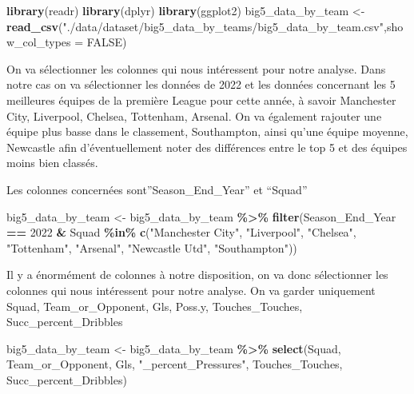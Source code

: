 \documentclass[
]{article}
\newenvironment{Shaded}{\begin{snugshade}}{\end{snugshade}}
\newcommand{\AttributeTok}[1]{\textcolor[rgb]{0.13,0.29,0.53}{#1}}
\newcommand{\ConstantTok}[1]{\textcolor[rgb]{0.56,0.35,0.01}{#1}}
\newcommand{\DecValTok}[1]{\textcolor[rgb]{0.00,0.00,0.81}{#1}}
\newcommand{\FunctionTok}[1]{\textcolor[rgb]{0.13,0.29,0.53}{\textbf{#1}}}
\newcommand{\NormalTok}[1]{#1}
\newcommand{\OtherTok}[1]{\textcolor[rgb]{0.56,0.35,0.01}{#1}}
\newcommand{\SpecialCharTok}[1]{\textcolor[rgb]{0.81,0.36,0.00}{\textbf{#1}}}
\newcommand{\StringTok}[1]{\textcolor[rgb]{0.31,0.60,0.02}{#1}}
\begin{document}
\begin{Shaded}
\begin{Highlighting}[]
\FunctionTok{library}\NormalTok{(readr)}
\FunctionTok{library}\NormalTok{(dplyr)}
\FunctionTok{library}\NormalTok{(ggplot2)}
\NormalTok{big5\_data\_by\_team }\OtherTok{\textless{}{-}} \FunctionTok{read\_csv}\NormalTok{(}\StringTok{"./data/dataset/big5\_data\_by\_teams/big5\_data\_by\_team.csv"}\NormalTok{,}\AttributeTok{show\_col\_types =} \ConstantTok{FALSE}\NormalTok{)}
\end{Highlighting}
\end{Shaded}

On va sélectionner les colonnes qui nous intéressent pour notre analyse.
Dans notre cas on va sélectionner les données de 2022 et les données
concernant les 5 meilleures équipes de la première League pour cette
année, à savoir Manchester City, Liverpool, Chelsea, Tottenham, Arsenal.
On va également rajouter une équipe plus basse dans le classement,
Southampton, ainsi qu'une équipe moyenne, Newcastle afin
d'éventuellement noter des différences entre le top 5 et des équipes
moins bien classés.

Les colonnes concernées sont''Season\_End\_Year'' et ``Squad''

\begin{Shaded}
\begin{Highlighting}[]
\NormalTok{big5\_data\_by\_team }\OtherTok{\textless{}{-}}\NormalTok{ big5\_data\_by\_team }\SpecialCharTok{\%\textgreater{}\%} \FunctionTok{filter}\NormalTok{(Season\_End\_Year }\SpecialCharTok{==} \DecValTok{2022} \SpecialCharTok{\&}\NormalTok{ Squad }\SpecialCharTok{\%in\%} \FunctionTok{c}\NormalTok{(}\StringTok{"Manchester City"}\NormalTok{, }\StringTok{"Liverpool"}\NormalTok{, }\StringTok{"Chelsea"}\NormalTok{, }\StringTok{"Tottenham"}\NormalTok{, }\StringTok{"Arsenal"}\NormalTok{, }\StringTok{"Newcastle Utd"}\NormalTok{, }\StringTok{"Southampton"}\NormalTok{))}
\end{Highlighting}
\end{Shaded}

Il y a énormément de colonnes à notre disposition, on va donc
sélectionner les colonnes qui nous intéressent pour notre analyse. On va
garder uniquement Squad, Team\_or\_Opponent, Gls, Poss.y,
Touches\_Touches, Succ\_percent\_Dribbles

\begin{Shaded}
\begin{Highlighting}[]
\NormalTok{big5\_data\_by\_team }\OtherTok{\textless{}{-}}\NormalTok{ big5\_data\_by\_team }\SpecialCharTok{\%\textgreater{}\%} \FunctionTok{select}\NormalTok{(Squad, Team\_or\_Opponent, Gls, }\StringTok{"\_percent\_Pressures"}\NormalTok{, Touches\_Touches, Succ\_percent\_Dribbles)}
\end{Highlighting}
\end{Shaded}
\end{document}
